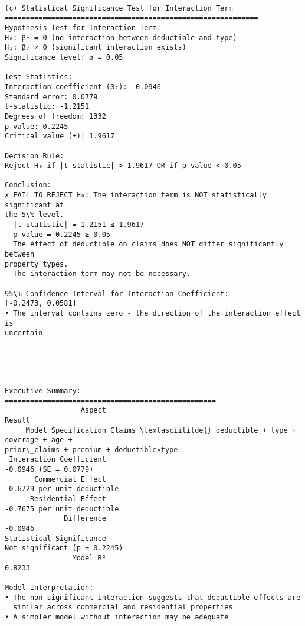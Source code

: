 \documentclass[8pt, twocolumn]{extarticle}
\begin{document}
    \begin{Verbatim}[commandchars=\\\{\}]

(c) Statistical Significance Test for Interaction Term
============================================================
Hypothesis Test for Interaction Term:
H₀: β₇ = 0 (no interaction between deductible and type)
H₁: β₇ ≠ 0 (significant interaction exists)
Significance level: α = 0.05

Test Statistics:
Interaction coefficient (β₇): -0.0946
Standard error: 0.0779
t-statistic: -1.2151
Degrees of freedom: 1332
p-value: 0.2245
Critical value (±): 1.9617

Decision Rule:
Reject H₀ if |t-statistic| > 1.9617 OR if p-value < 0.05

Conclusion:
✗ FAIL TO REJECT H₀: The interaction term is NOT statistically significant at
the 5\% level.
  |t-statistic| = 1.2151 ≤ 1.9617
  p-value = 0.2245 ≥ 0.05
  The effect of deductible on claims does NOT differ significantly between
property types.
  The interaction term may not be necessary.

95\% Confidence Interval for Interaction Coefficient:
[-0.2473, 0.0581]
• The interval contains zero - the direction of the interaction effect is
uncertain
    \end{Verbatim}

    \begin{center}
    \end{center}
    { \hspace*{\fill} \\}
    
    \begin{Verbatim}[commandchars=\\\{\}]


Executive Summary:
==================================================
                  Aspect
Result
     Model Specification Claims \textasciitilde{} deductible + type + coverage + age +
prior\_claims + premium + deductible×type
 Interaction Coefficient
-0.0946 (SE = 0.0779)
       Commercial Effect
-0.6729 per unit deductible
      Residential Effect
-0.7675 per unit deductible
              Difference
-0.0946
Statistical Significance
Not significant (p = 0.2245)
                Model R²
0.8233

Model Interpretation:
• The non-significant interaction suggests that deductible effects are
  similar across commercial and residential properties
• A simpler model without interaction may be adequate
    \end{Verbatim}
\end{document}
